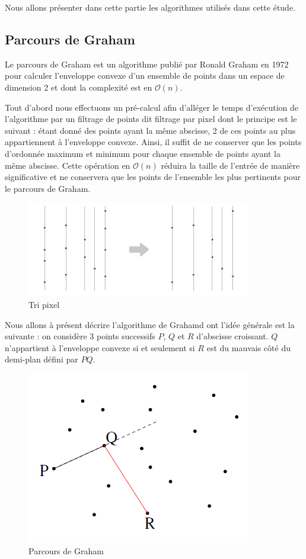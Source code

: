Nous allons présenter dans cette partie les algorithmes utilisés dans cette étude.
\subsection{Parcours de Graham}
Le parcours de Graham est un algorithme publié par Ronald Graham en 1972 pour calculer l'enveloppe convexe d'un ensemble de points dans un espace de dimension 2 et dont la complexité est en $\mathcal{O}(n)$.

Tout d'abord nous effectuons un pré-calcul afin d'alléger le temps d'exécution de l'algorithme par un filtrage de points dit filtrage par pixel dont le principe est le suivant : étant donné des points ayant la même abscisse, 2 de ces points au plus appartiennent à l'enveloppe convexe. Ainsi, il suffit de ne conserver que les points d'ordonnée maximum et minimum pour chaque ensemble de points ayant la même abscisse. Cette opération en $\mathcal{O}(n)$ réduira la taille de l'entrée de manière significative et ne conservera que les points de l'ensemble les plus pertinents pour le parcours de Graham.

\begin{figure}[ht]
\begin{center}
\includegraphics[scale=0.7]{images/tripixel.png}
\caption{Tri pixel}
\end{center}
\end{figure}

Nous allons à présent décrire l'algorithme de Grahamd ont l'idée générale est la suivante : on considère 3 points successifs $P$, $Q$ et $R$ d'abscisse croissant. $Q$ n'appartient à l'enveloppe convexe si et seulement si $R$ est du mauvais côté du demi-plan défini par $PQ$.

\begin{figure}[ht]
\begin{center}
\includegraphics[scale=0.7]{images/graham.png}
\caption{Parcours de Graham}
\end{center}
\end{figure}


